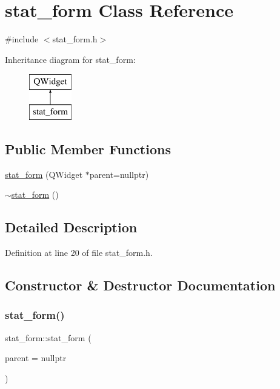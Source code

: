 \hypertarget{classstat__form}{}\section{stat\+\_\+form Class Reference}
\label{classstat__form}


{\ttfamily \#include $<$stat\+\_\+form.\+h$>$}

Inheritance diagram for stat\+\_\+form\+:\begin{figure}[H]
\begin{center}
\leavevmode
\includegraphics[height=2.000000cm]{classstat__form}
\end{center}
\end{figure}
\subsection*{Public Member Functions}
\begin{DoxyCompactItemize}
\item 
\mbox{\hyperlink{classstat__form_af282c982608f55b942190fd743d858bc}{stat\+\_\+form}} (Q\+Widget $\ast$parent=nullptr)
\item 
\mbox{\hyperlink{classstat__form_a7a0e7f191915a1fcf7e2043bc39448b0}{$\sim$stat\+\_\+form}} ()
\end{DoxyCompactItemize}


\subsection{Detailed Description}


Definition at line 20 of file stat\+\_\+form.\+h.



\subsection{Constructor \& Destructor Documentation}
\mbox{\label{classstat__form_af282c982608f55b942190fd743d858bc}} 
\subsubsection{\texorpdfstring{stat\_form()}{stat\_form()}}
{\footnotesize\ttfamily stat\+\_\+form\+::stat\+\_\+form (\begin{DoxyParamCaption}\item[{Q\+Widget $\ast$}]{parent = {\ttfamily nullptr} }\end{DoxyParamCaption})\hspace{0.3cm}{\ttfamily [explicit]}}



